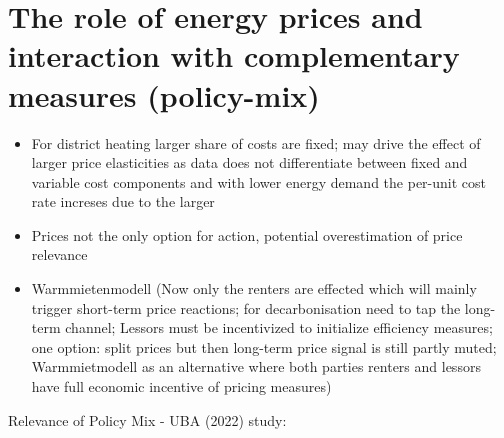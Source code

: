 \documentclass[12pt,twoside]{reedthesis}
\begin{document}
\hypertarget{the-role-of-energy-prices-and-interaction-with-complementary-measures-policy-mix}{%
\section{The role of energy prices and interaction with complementary measures (policy-mix)}\label{the-role-of-energy-prices-and-interaction-with-complementary-measures-policy-mix}}
\begin{itemize}
\item
  For district heating larger share of costs are fixed; may drive the effect of larger price elasticities as data does not differentiate between fixed and variable cost components and with lower energy demand the per-unit cost rate increses due to the larger
\item
  Prices not the only option for action, potential overestimation of price relevance
\item
  Warmmietenmodell (Now only the renters are effected which will mainly trigger short-term price reactions; for decarbonisation need to tap the long-term channel; Lessors must be incentivized to initialize efficiency measures; one option: split prices but then long-term price signal is still partly muted; Warmmietmodell as an alternative where both parties renters and lessors have full economic incentive of pricing measures)
\end{itemize}
Relevance of Policy Mix - UBA (2022) study:
\end{document}

